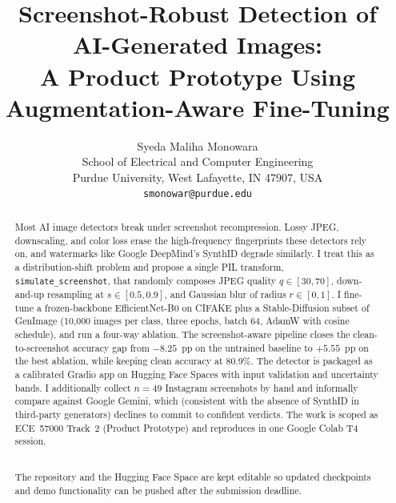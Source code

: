 \documentclass{article}
\title{Screenshot-Robust Detection of AI-Generated Images: \\
A Product Prototype Using Augmentation-Aware Fine-Tuning}
\author{Syeda Maliha Monowara \\
School of Electrical and Computer Engineering \\
Purdue University, West Lafayette, IN 47907, USA \\
\texttt{smonowar@purdue.edu} \\
}
\begin{document}
\pagestyle{plain}
\fancyhf{}
\fancyfoot[C]{\thepage}
\renewcommand{\headrulewidth}{0pt}

\maketitle
\thispagestyle{plain}

\begin{abstract}
Most AI image detectors break under screenshot recompression. Lossy
JPEG, downscaling, and color loss erase the high-frequency
fingerprints these detectors rely on, and watermarks like Google
DeepMind's SynthID degrade similarly. I treat this as a
distribution-shift problem and propose a single PIL transform,
\texttt{simulate\_screenshot}, that randomly composes JPEG quality
$q \in [30,70]$, down-and-up resampling at $s \in [0.5, 0.9]$, and
Gaussian blur of radius $r \in [0,1]$. I fine-tune a frozen-backbone
EfficientNet-B0 on CIFAKE plus a Stable-Diffusion subset of GenImage
(10{,}000 images per class, three epochs, batch 64, AdamW with
cosine schedule), and run a four-way ablation. The screenshot-aware
pipeline closes the clean-to-screenshot accuracy gap from $-8.25$~pp
on the untrained baseline to $+5.55$~pp on the best ablation, while
keeping clean accuracy at 80.9\%. The detector is packaged as a
calibrated Gradio app on Hugging Face Spaces with input validation
and uncertainty bands. I additionally collect $n=49$ Instagram
screenshots by hand and informally compare against Google Gemini,
which (consistent with the absence of SynthID in third-party
generators) declines to commit to confident verdicts. The work is
scoped as ECE~57000 Track~2 (Product Prototype) and reproduces in
one Google Colab T4 session.

\smallskip
{}\\[2pt]
{\small The repository and the Hugging Face Space are kept editable so
updated checkpoints and demo functionality can be pushed after the
submission deadline.}
\end{abstract}
\end{document}
